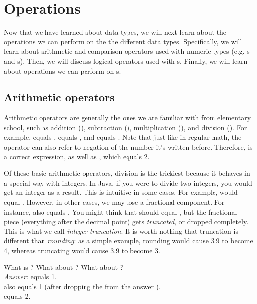 \section{Operations}
Now that we have learned about data types, we will next learn about the operations we can perform on the the different data types. Specifically, we will learn about arithmetic and comparison operators used with numeric types (e.g. s and s). Then, we will discuss logical operators used with s. Finally, we will learn about operations we can perform on s.

\subsection{Arithmetic operators}
Arithmetic operators are generally the ones we are familiar with from elementary school, such as addition (\ic{+}), subtraction (\ic{-}), multiplication (\ic{*}), and division (\ic{/}). For example,  equals ,  equals , and  equals . Note that just like in regular math, the operator \ic{-} can also refer to negation of the number it's written before. Therefore,  is a correct expression, as well as , which equals 2.

Of these basic arithmetic operators, division is the trickiest because it behaves in a special way with integers. In Java, if you were to divide two integers, you would get an integer as a result. This is intuitive in some cases. For example,  would equal . However, in other cases, we may lose a fractional component. For instance,  also equals . You might think that  should equal , but the fractional piece (everything after the decimal point) gets \emph{truncated}, or dropped completely. This is what we call \emph{integer truncation}. It is worth nothing that truncation is different than \emph{rounding}: as a simple example, rounding would cause 3.9 to become 4, whereas truncating would cause 3.9 to become 3.

\begin{example}
What is ? What about ? What about ? \\

\noindent \emph{Answer}:  equals {1}. \\
 also equals {1} (after dropping the  from the answer ). \\
 equals {2}.
\end{example}

